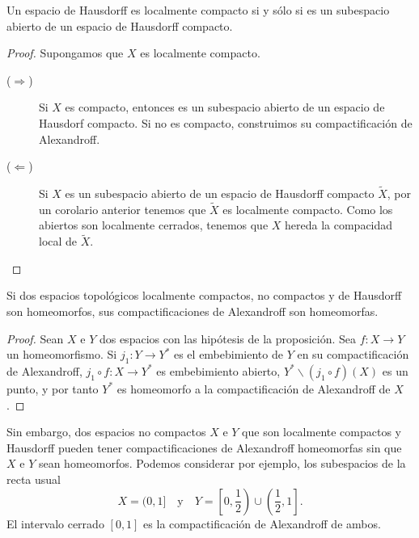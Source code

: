 \begin{prop}
Un espacio de Hausdorff es localmente compacto si y sólo si es un subespacio abierto de un espacio de Hausdorff compacto.
\end{prop}
\begin{proof}
Supongamos que $\displaystyle X $ es localmente compacto. 
\begin{description}
\item[($\displaystyle \Rightarrow $)] Si $\displaystyle X $ es compacto, entonces es un subespacio abierto de un espacio de Hausdorf compacto. Si no es compacto, construimos su compactificación de Alexandroff.
\item[($\displaystyle \Leftarrow $)] Si $\displaystyle X $ es un subespacio abierto de un espacio de Hausdorff compacto $\displaystyle \tilde{X} $, por un corolario anterior tenemos que $\displaystyle \tilde{X} $ es localmente compacto. Como los abiertos son localmente cerrados, tenemos que $\displaystyle X $ hereda la compacidad local de $\displaystyle \tilde{X} $.
\end{description}
\end{proof}
\begin{prop}
Si dos espacios topológicos localmente compactos, no compactos y de Hausdorff son homeomorfos, sus compactificaciones de Alexandroff son homeomorfas.
\end{prop}
\begin{proof}
Sean $\displaystyle X $ e $\displaystyle Y $ dos espacios con las hipótesis de la proposición. Sea $\displaystyle f : X \to Y $ un homeomorfismo. Si $\displaystyle j_{1} : Y \to Y^{*} $ es el embebimiento de $\displaystyle Y $ en su compactificación de Alexandroff, $\displaystyle j_{1}\circ f : X \to Y^{*} $ es embebimiento abierto, $\displaystyle Y^{*}\backslash \left(j_{1}\circ f\right)\left(X\right) $ es un punto, y por tanto $\displaystyle Y^{*} $ es homeomorfo a la compactificación de Alexandroff de $\displaystyle X $. 
\end{proof}
\begin{observation}
Sin embargo, dos espacios no compactos $\displaystyle X $ e $\displaystyle Y $ que son localmente compactos y Hausdorff pueden tener compactificaciones de Alexandroff homeomorfas sin que $\displaystyle X $ e $\displaystyle Y $ sean homeomorfos. Podemos considerar por ejemplo, los subespacios de la recta usual
\[X = (0,1] \quad \text{y} \quad Y = \left[0, \frac{1}{2}\right)\cup\left(\frac{1}{2}, 1\right] .\]
El intervalo cerrado $\displaystyle \left[0,1\right]  $ es la compactificación de Alexandroff de ambos.
\end{observation}

